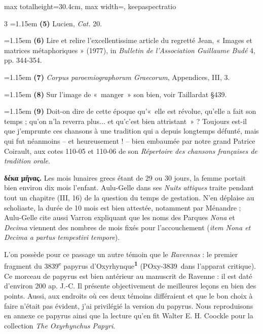 \documentclass[11pt,twoside]{book}
\newcommand{\italique}[1]{\textit{#1}}
\newcommand{\nieme}[1]{#1\textsuperscript{e}}
\newcommand{\PsiDeux}{POxy-3839}
\newcommand{\latin}[1]{\textit{#1}}
\newcommand{\marqueur}[1]{\textsuperscript{\color{rubricRed}\textbf{#1}}}
\begin{document}
\begin{adjustbox}{max totalheight=30.4cm, max width=\textwidth, keepaspectratio}
\begin{minipage}{\textwidth}
{\begin{multicols}{3}
\noindent\hangindent=1.15em {\color{sepiaNote}\textbf{(5)}} Lucien, \italique{Cat.} 20.
\par\vspace{1.5pt}
\noindent\hangindent=1.15em {\color{sepiaNote}\textbf{(6)}} Lire et relire l'excellentissime article du regretté Jean, « Images et matrices métaphoriques » (1977), in \italique{Bulletin de l'Association Guillaume Budé} 4, pp. 344-354.
\par\vspace{1.5pt}
\noindent\hangindent=1.15em {\color{sepiaNote}\textbf{(7)}} \italique{Corpus paroemiographorum Graecorum}, Appendices, III, 3.
\par\vspace{1.5pt}
\noindent\hangindent=1.15em {\color{sepiaNote}\textbf{(8)}} Sur l'image de «~manger~» son bien, voir Taillardat §439.
\par\vspace{1.5pt}
\noindent\hangindent=1.15em {\color{sepiaNote}\textbf{(9)}} Doit-on dire de cette époque qu'«~elle est révolue, qu'elle a fait son temps ; qu'on n'la reverra plus... et qu'c'est bien attristant~» ? Toujours est-il que j'emprunte ces chansons à une tradition qui a depuis longtemps défunté, mais qui fut néanmoins -- et heureusement ! -- bien embaumée par notre grand Patrice Coirault, aux cotes 110-05 et 110-06 de son \italique{Répertoire des chansons françaises de tradition orale}.
\par\vspace{1.5pt}
 \textbf{δέκα μῆνας.} Les mois lunaires grecs étant de 29 ou 30 jours, la femme portait bien environ dix mois l'enfant. Aulu-Gelle dans ses \italique{Nuits attiques} traite pendant tout un chapitre (III, 16) de la question du temps de gestation. N'en déplaise au scholiaste, la durée de 10 mois est bien attestée, notamment par Ménandre ; Aulu-Gelle cite aussi Varron expliquant que les noms des Parques \italique{Nona} et \italique{Decima} viennent des nombres de mois fixés pour l'accouchement (\latin{item Nona et Decima a partus tempestivi tempore}).
\par\vspace{1.5pt}
 \textbf{} L'on possède pour ce passage un autre témoin que le \italique{Ravennas} : le premier fragment du \nieme{3839} papyrus d'Oxyrhynque\marqueur{1} (\PsiDeux \  dans l'apparat critique). Ce morceau de papyrus est bien antérieur au manuscrit de Ravenne : il est daté d'environ 200 ap. J.-C. Il présente objectivement de meilleures leçons en bien des points. Aussi, aux endroits où ces deux témoins différaient et que le bon choix à faire n'était pas évident, j'ai privilégié la version du papyrus. Nous reproduisons en annexe ce papyrus ainsi que la lecture qu'en fit Walter E. H. Coockle pour la collection \italique{The Oxyrhynchus Papyri}.
\par\end{multicols}}
\end{minipage}\end{adjustbox}
\end{document}
